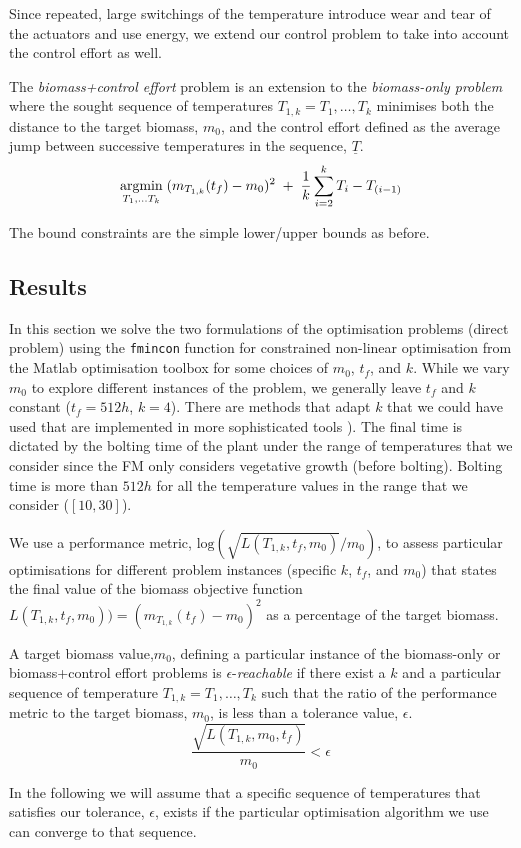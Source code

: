 Since repeated, large switchings of the temperature introduce wear and tear of
the actuators and use energy, we extend our control problem to take into account
the control effort as well.

\begin{definition}
  The \emph{biomass+control effort} problem is an extension to the
  \emph{biomass-only problem} where the sought sequence of temperatures
  $T_{1, k}=T_1, \dots, T_k$ minimises both the distance to the target biomass,
  $m_0$, and the control effort defined as the average jump between successive
  temperatures in the sequence, $\underline{T}$.
$$ \operatorname*{argmin}_{T_1, \dots T_k} \; (m_{T_{1, k}}(t_f) - m_0)^2 \; + \; \frac{1}{k} \sum_{i=2}^{k} T_i - T_{(i-1)}$$
\end{definition}
The bound constraints are the simple lower/upper bounds as before. 

\subsection{Results}
In this section we solve the two formulations of the optimisation problems
(direct problem) using the \texttt{fmincon} function for constrained non-linear
optimisation from the Matlab optimisation toolbox for some choices of $m_0$,
$t_f$, and $k$. While we vary $m_0$ to explore different instances of the
problem, we generally leave $t_f$ and $k$ constant ($t_f=512h$, $k=4$). There
are methods that adapt $k$ that we could have used that are implemented in more
sophisticated tools \citep[mesh refinement, AMIGO
tool;][]{balsa-canto_amigo2_2016}). The final time is dictated by the bolting
time of the plant under the range of temperatures that we consider since the FM
only considers vegetative growth (before bolting). Bolting time is more than
$512h$ for all the temperature values in the range that we consider
($[10, 30]$).

We use a performance metric, $\mathrm{log}(\sqrt{L(T_{1, k}, t_f, m_0)} / m_0)$,
to assess particular optimisations for different problem instances (specific
$k$, $t_f$, and $m_0$) that states the final value of the biomass objective
function $L(T_{1, k}, t_f, m_0))=(m_{T_{1, k}}(t_f) - m_0)^2$ as a percentage of
the target biomass.

\begin{definition}
  A target biomass value,$m_0$, defining a particular instance of the
  biomass-only or biomass+control effort problems is $\epsilon$-\emph{reachable}
  if there exist a $k$ and a particular sequence of temperature
  $T_{1, k}=T_1, \dots, T_k$ such that the ratio of the performance metric to the
  target biomass, $m_0$, is less than a tolerance value, $\epsilon$.
$$
\frac{\sqrt{L(T_{1, k}, m_0, t_f)}}{m_0} < \epsilon
$$
\end{definition}
In the following we will assume that a specific sequence of temperatures that
satisfies our tolerance, $\epsilon$, exists if the particular optimisation
algorithm we use can converge to that sequence.

